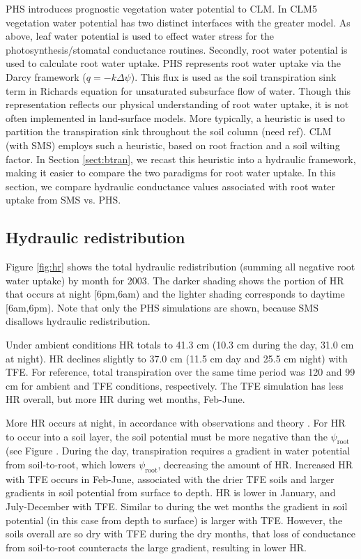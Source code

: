 \documentclass[draft,linenumbers]{agujournal}
\begin{document}
PHS introduces prognostic vegetation water potential to CLM.
In CLM5 vegetation water potential has two distinct interfaces with the greater model.
As above, leaf water potential is used to effect water stress for the photosynthesis/stomatal conductance routines.
Secondly, root water potential is used to calculate root water uptake.
PHS represents root water uptake via the Darcy framework ($q=-k\Delta\psi$).
This flux is used as the soil transpiration sink term in Richards equation for unsaturated subsurface flow of water.
Though this representation reflects our physical understanding of root water uptake, it is not often implemented in land-surface models.
More typically, a heuristic is used to partition the transpiration sink throughout the soil column (need ref).
CLM (with SMS) employs such a heuristic, based on root fraction and a soil wilting factor. 
In Section \ref{sect:btran}, we recast this heuristic into a hydraulic framework, making it easier to compare the two paradigms for root water uptake.
In this section, we compare hydraulic conductance values associated with root water uptake from SMS vs. PHS.


\subsection{Hydraulic redistribution}

Figure \ref{fig:hr} shows the total hydraulic redistribution (summing all negative root water uptake) by month for 2003. 
The darker shading shows the portion of HR that occurs at night [6pm,6am) and the lighter shading corresponds to daytime [6am,6pm). 
Note that only the PHS simulations are shown, because SMS disallows hydraulic redistribution.

Under ambient conditions HR totals to 41.3 cm (10.3 cm during the day, 31.0 cm at night). 
HR declines slightly to 37.0 cm (11.5 cm day and 25.5 cm night) with TFE.
For reference, total transpiration over the same time period was 120 and 99 cm for ambient and TFE conditions, respectively.
The TFE simulation has less HR overall, but more HR during wet months, Feb-June.

More HR occurs at night, in accordance with observations and theory \citep{oliveira2005,lee2005}.
For HR to occur into a soil layer, the soil potential must be more negative than the $\psi_{\text{root}}$ (see Figure .
During the day, transpiration requires a gradient in water potential from soil-to-root, which lowers $\psi_{\text{root}}$, decreasing the amount of HR.
Increased HR with TFE occurs in Feb-June, associated with the drier TFE soils and larger gradients in soil potential from surface to depth.
HR is lower in January, and July-December with TFE.
Similar to during the wet months the gradient in soil potential (in this case from depth to surface) is larger with TFE.
However, the soils overall are so dry with TFE during the dry months, that loss of conductance from soil-to-root counteracts the large gradient, resulting in lower HR.
\end{document}
